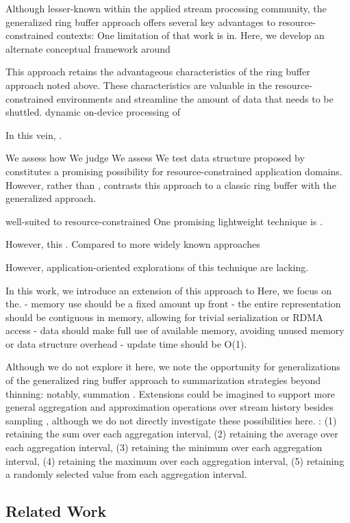 Although lesser-known within the applied stream processing community, the generalized ring buffer approach offers several key advantages to resource-constrained contexts:
One limitation of that work is in.
Here, we develop an alternate conceptual framework around

This approach retains the advantageous characteristics of the ring buffer approach noted above.
These characteristics are valuable in the resource-constrained environments and streamline the amount of data that needs to be shuttled.
 dynamic on-device processing of

In this vein,  .

We assess how
We judge
We assess
We test
 data structure proposed by  constitutes a promising possibility for resource-constrained application domains.
However, rather than ,
 contrasts this approach to a classic ring buffer with the generalized approach.


well-suited to resource-constrained
One promising lightweight technique is  .


However, this .
Compared to more widely known approaches

However, application-oriented explorations of this technique are lacking.

In this work, we introduce an extension of this approach to
Here, we focus on the.
- memory use should be a fixed amount up front
- the entire representation should be contiguous in memory, allowing for trivial serialization or RDMA access
- data should make full use of available memory, avoiding unused memory or data structure overhead
- update time should be O(1).

Although we do not explore it here, we note the opportunity for generalizations of the generalized ring buffer approach to summarization strategies beyond thinning: notably, summation \citep{gunther2014compressing}.
Extensions could be imagined to support more general aggregation and approximation operations over stream history besides sampling \citep{schoellhammer2024lightweight}, although we do not directly investigate these possibilities here.
\citet{gunther2014compressing}:
(1) retaining the sum over each aggregation interval,
(2) retaining the average over each aggregation interval,
(3) retaining the minimum over each aggregation interval,
(4) retaining the maximum over each aggregation interval,
(5) retaining a randomly selected value from each aggregation interval.

\subsection{Related Work}

